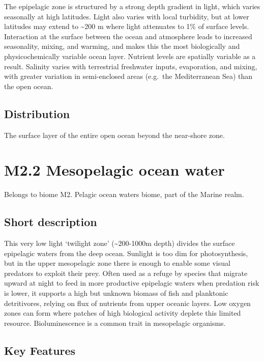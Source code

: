 \documentclass[
  letterpaper,
  DIV=11,
  numbers=noendperiod]{scrartcl}
\begin{document}
The epipelagic zone is structured by a strong depth gradient in light,
which varies seasonally at high latitudes. Light also varies with local
turbidity, but at lower latitudes may extend to \textasciitilde200 m
where light attenuates to 1\% of surface levels. Interaction at the
surface between the ocean and atmosphere leads to increased seasonality,
mixing, and warming, and makes this the most biologically and
physicochemically variable ocean layer. Nutrient levels are spatially
variable as a result. Salinity varies with terrestrial freshwater
inputs, evaporation, and mixing, with greater variation in semi-enclosed
areas (e.g.~the Mediterranean Sea) than the open ocean.

\subsection{Distribution}\label{distribution-35}

The surface layer of the entire open ocean beyond the near-shore zone.

\section{M2.2 Mesopelagic ocean
water}\label{m2.2-mesopelagic-ocean-water}

Belongs to biome M2. Pelagic ocean waters biome, part of the Marine
realm.

\subsection{Short description}\label{short-description-36}

This very low light `twilight zone' (\textasciitilde200-1000m depth)
divides the surface epipelagic waters from the deep ocean. Sunlight is
too dim for photosynthesis, but in the upper mesopelagic zone there is
enough to enable some visual predators to exploit their prey. Often used
as a refuge by species that migrate upward at night to feed in more
productive epipelagic waters when predation risk is lower, it supports a
high but unknown biomass of fish and planktonic detritivores, relying on
flux of nutrients from upper oceanic layers. Low oxygen zones can form
where patches of high biological activity deplete this limited resource.
Bioluminescence is a common trait in mesopelagic organisms.

\subsection{Key Features}\label{key-features-36}
\end{document}
